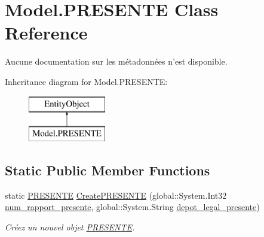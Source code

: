 \hypertarget{class_model_1_1_p_r_e_s_e_n_t_e}{\section{Model.\-P\-R\-E\-S\-E\-N\-T\-E Class Reference}
\label{class_model_1_1_p_r_e_s_e_n_t_e}
}


Aucune documentation sur les métadonnées n'est disponible.  


Inheritance diagram for Model.\-P\-R\-E\-S\-E\-N\-T\-E\-:\begin{figure}[H]
\begin{center}
\leavevmode
\includegraphics[height=2.000000cm]{class_model_1_1_p_r_e_s_e_n_t_e}
\end{center}
\end{figure}
\subsection*{Static Public Member Functions}
\begin{DoxyCompactItemize}
\item 
static \hyperlink{class_model_1_1_p_r_e_s_e_n_t_e}{P\-R\-E\-S\-E\-N\-T\-E} \hyperlink{class_model_1_1_p_r_e_s_e_n_t_e_a0ef32fb45a1553c8d9fde78dd28d4c36}{Create\-P\-R\-E\-S\-E\-N\-T\-E} (global\-::\-System.\-Int32 \hyperlink{class_model_1_1_p_r_e_s_e_n_t_e_a61ceff1e6daaf303f9bdc311fe3f140e}{num\-\_\-rapport\-\_\-presente}, global\-::\-System.\-String \hyperlink{class_model_1_1_p_r_e_s_e_n_t_e_a182eef0b5545f4d27fb1fbc2838a6bf7}{depot\-\_\-legal\-\_\-presente})
\begin{DoxyCompactList}\small\item\em Créez un nouvel objet \hyperlink{class_model_1_1_p_r_e_s_e_n_t_e}{P\-R\-E\-S\-E\-N\-T\-E}. \end{DoxyCompactList}\end{DoxyCompactItemize}

